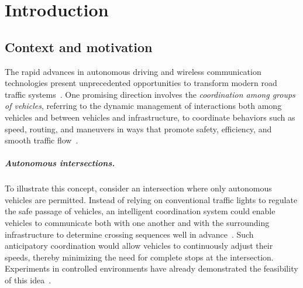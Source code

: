 \documentclass[a4paper]{report}
\theoremstyle{definition}
\theoremstyle{plain}
\begin{document}
\renewcommand{\cftdot}{\textcolor{gray!70}{.}}

\newpage
\tableofcontents









\chapter{Introduction}\label{chap:introduction}

\section{Context and motivation}

The rapid advances in autonomous driving and wireless communication technologies
present unprecedented opportunities to transform modern road traffic systems~\cite{padmajaExplorationIssuesChallenges2023}.
One promising direction involves the \emph{coordination among groups of
vehicles}, referring to the dynamic management of interactions both among
vehicles and between vehicles and infrastructure, to coordinate behaviors such
as speed, routing, and maneuvers in ways that promote safety, efficiency, and
smooth traffic flow~\cite{marianiCoordinationAutonomousVehicles2022}.

\paragraph{Autonomous intersections.}

To illustrate this concept, consider an intersection where only autonomous
vehicles are permitted. Instead of relying on conventional traffic lights to
regulate the safe passage of vehicles, an intelligent coordination system could
enable vehicles to communicate both with one another and with the surrounding
infrastructure to determine crossing sequences well in
advance~\cite{dresnerMultiagentApproachAutonomous2008,khayatianSurveyIntersectionManagement2020,guoUrbanTrafficSignal2019}.
Such anticipatory coordination would allow vehicles to continuously adjust their
speeds, thereby minimizing the need for complete stops at the intersection.
Experiments in controlled environments have already demonstrated the feasibility
of this
idea~\cite{khayatianCrossroadsTimeawareApproach2020,hultOptimalCoordinationThree}.
\end{document}
